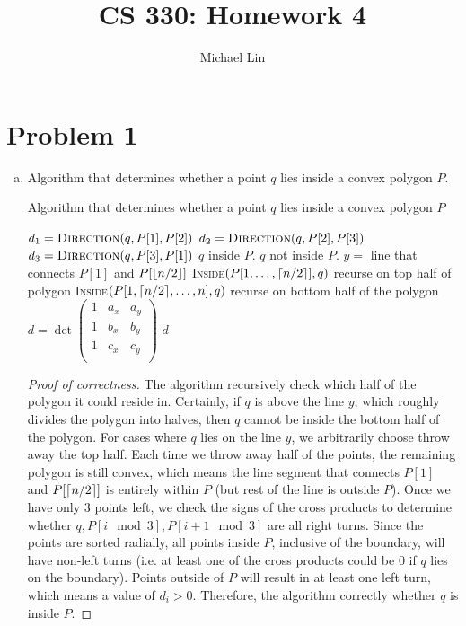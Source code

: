 \documentclass{article}
\title{CS 330: Homework 4}
\author{Michael Lin}
\DeclarePairedDelimiter\ceil{\lceil}{\rceil}
\DeclarePairedDelimiter\floor{\lfloor}{\rfloor}
\begin{document}
\maketitle
\section*{Problem 1}
\begin{enumerate}[(a)]
\item Algorithm that determines whether a point $q$ lies inside a convex polygon $P$.
	\begin{algorithm}
	\caption{Algorithm that determines whether a point $q$ lies inside a convex polygon $P$}
	\begin{algorithmic}[1]
		\State $d_1=\textsc{Direction}(q,P[1],P[2])$
		\State $d_2=\textsc{Direction}(q,P[2],P[3])$
		\State $d_3=\textsc{Direction}(q,P[3],P[1])$
			\State \Return $q$ inside $P$.
		\Else
			\State \Return $q$ not inside $P$.
		\EndIf
	\EndIf
		\State $y = $ line that connects $P[1]$ and $P[\floor{n/2}]$
			\State \Return \textsc{Inside}$(P[1,\dots,\ceil{n/2}],q)$
			\Comment recurse on top half of polygon
		\Else
			\State \Return \textsc{Inside}$(P[1,\ceil{n/2},\dots,n],q)$
			\Comment recurse on bottom half of the polygon
		\EndIf
	\EndIf	
	\EndFunction
	\\
	\State $d = \det
		\begin{pmatrix}
		1 & a_x & a_y \\
		1 & b_x & b_y \\
		1 & c_x & c_y \\
		\end{pmatrix}
	$
	\State \Return $d$
	\EndFunction
	\end{algorithmic}
	\end{algorithm}

\begin{proof}[Proof of correctness]
The algorithm recursively check which half of the polygon it could reside in. Certainly, if $q$ is above the line $y$, which roughly divides the polygon into halves, then $q$ cannot be inside the bottom half of the polygon. For cases where $q$ lies on the line $y$, we arbitrarily choose throw away the top half. Each time we throw away half of the points, the remaining polygon is still convex, which means the line segment that connects $P[1]$ and $P[\ceil{n/2}]$ is entirely within $P$ (but rest of the line is outside $P$). Once we have only 3 points left, we check the signs of the cross products to determine whether $q, P[i \mod 3], P[i+1 \mod 3]$ are all right turns. Since the points are sorted radially, all points inside $P$, inclusive of the boundary, will have non-left turns (i.e. at least one of the cross products could be 0 if $q$ lies on the boundary). Points outside of $P$ will result in at least one left turn, which means a value of $d_i>0$. Therefore, the algorithm correctly whether $q$ is inside $P$.
\end{proof}


\end{enumerate}
\end{document}
